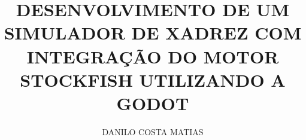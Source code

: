 \documentclass[versao=digital]{tc_ifto}
\author{DANILO COSTA MATIAS}
\title{DESENVOLVIMENTO DE UM SIMULADOR DE XADREZ COM INTEGRAÇÃO DO MOTOR STOCKFISH UTILIZANDO A GODOT}
\begin{document}
	
	
	\textual
	
	
	
	
	
	
	
	
	\postextual	
	
	
	\apendices
	
\end{document}
